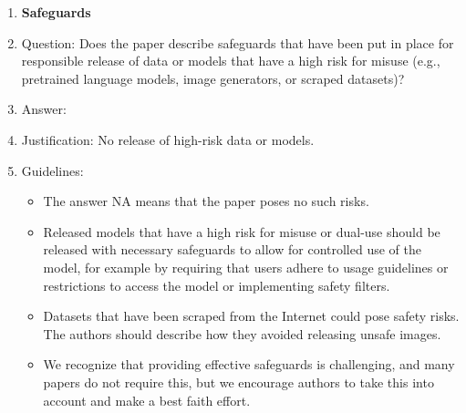 \documentclass{article}
\begin{document}
{\begin{enumerate}
\item {\bf Safeguards}
    \item[] Question: Does the paper describe safeguards that have been put in place for responsible release of data or models that have a high risk for misuse (e.g., pretrained language models, image generators, or scraped datasets)?
    \item[] Answer: \answerNA{} %
    \item[] Justification: No release of high-risk data or models.
    \item[] Guidelines:
    \begin{itemize}
        \item The answer NA means that the paper poses no such risks.
        \item Released models that have a high risk for misuse or dual-use should be released with necessary safeguards to allow for controlled use of the model, for example by requiring that users adhere to usage guidelines or restrictions to access the model or implementing safety filters.
        \item Datasets that have been scraped from the Internet could pose safety risks. The authors should describe how they avoided releasing unsafe images.
        \item We recognize that providing effective safeguards is challenging, and many papers do not require this, but we encourage authors to take this into account and make a best faith effort.
    \end{itemize}


\end{enumerate}}
\end{document}
